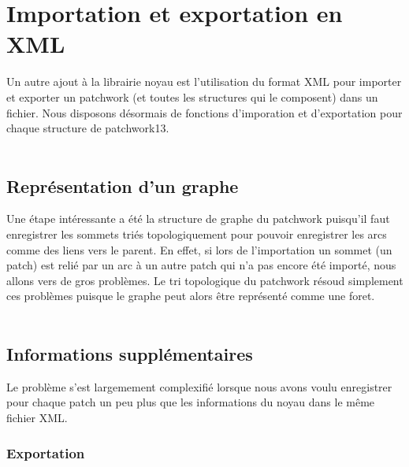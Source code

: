 \chapter{Importation et exportation en XML}

Un autre ajout \`a la librairie noyau est l'utilisation du format XML
pour importer et exporter un patchwork (et toutes les structures
qui le composent) dans un fichier. Nous disposons d\'esormais de fonctions
d'imporation et d'exportation pour chaque structure de patchwork13.\\
\\

\section{Repr\'esentation d'un graphe}

Une \'etape int\'eressante a \'et\'e la structure de graphe
du patchwork puisqu'il faut enregistrer les sommets tri\'es
topologiquement
pour pouvoir enregistrer les arcs comme des liens vers le parent.
En effet, si lors de l'importation un sommet (un patch) est reli\'e
par un arc \`a un autre patch qui n'a pas encore \'et\'e import\'e,
nous allons vers de gros probl\`emes. Le tri topologique du patchwork
r\'esoud simplement ces probl\`emes puisque le graphe peut alors \^etre
repr\'esent\'e comme une foret.\\
\\

\section{Informations suppl\'ementaires}

Le probl\`eme s'est largemement complexifi\'e lorsque nous
avons voulu enregistrer pour chaque patch un peu plus que
les informations du noyau dans le m\^eme fichier XML.\\


\newpage

\subsection{Exportation}

